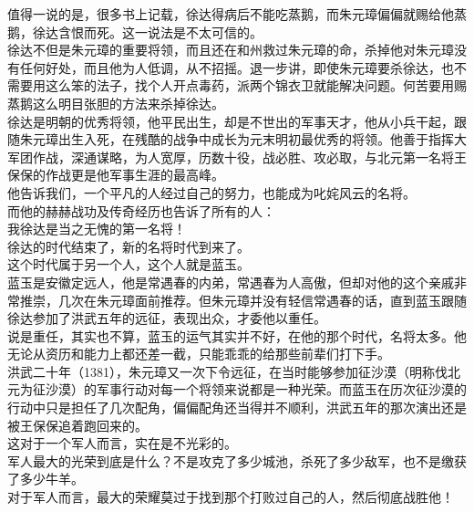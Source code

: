 \begin{multicols}{\theparacolNo}
值得一说的是，很多书上记载，徐达得病后不能吃蒸鹅，而朱元璋偏偏就赐给他蒸鹅，徐达含恨而死。这一说法是不太可信的。\\

徐达不但是朱元璋的重要将领，而且还在和州救过朱元璋的命，杀掉他对朱元璋没有任何好处，而且他为人低调，从不招摇。退一步讲，即使朱元璋要杀徐达，也不需要用这么笨的法子，找个人开点毒药，派两个锦衣卫就能解决问题。何苦要用赐蒸鹅这么明目张胆的方法来杀掉徐达。\\

徐达是明朝的优秀将领，他平民出生，却是不世出的军事天才，他从小兵干起，跟随朱元璋出生入死，在残酷的战争中成长为元末明初最优秀的将领。他善于指挥大军团作战，深通谋略，为人宽厚，历数十役，战必胜、攻必取，与北元第一名将王保保的作战更是他军事生涯的最高峰。\\

他告诉我们，一个平凡的人经过自己的努力，也能成为叱姹风云的名将。\\

而他的赫赫战功及传奇经历也告诉了所有的人：\\

我徐达是当之无愧的第一名将！\\

徐达的时代结束了，新的名将时代到来了。\\

这个时代属于另一个人，这个人就是蓝玉。\\

蓝玉是安徽定远人，他是常遇春的内弟，常遇春为人高傲，但却对他的这个亲戚非常推崇，几次在朱元璋面前推荐。但朱元璋并没有轻信常遇春的话，直到蓝玉跟随徐达参加了洪武五年的远征，表现出众，才委他以重任。\\

说是重任，其实也不算，蓝玉的运气其实并不好，在他的那个时代，名将太多。他无论从资历和能力上都还差一截，只能乖乖的给那些前辈们打下手。\\

洪武二十年（1381），朱元璋又一次下令远征，在当时能够参加征沙漠（明称伐北元为征沙漠）的军事行动对每一个将领来说都是一种光荣。而蓝玉在历次征沙漠的行动中只是担任了几次配角，偏偏配角还当得并不顺利，洪武五年的那次演出还是被王保保追着跑回来的。\\

这对于一个军人而言，实在是不光彩的。\\

军人最大的光荣到底是什么？不是攻克了多少城池，杀死了多少敌军，也不是缴获了多少牛羊。\\

对于军人而言，最大的荣耀莫过于找到那个打败过自己的人，然后彻底战胜他！\\


\end{multicols}
